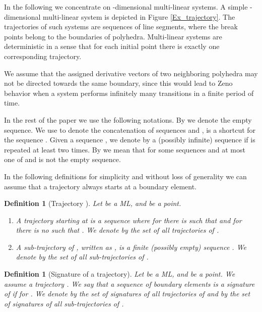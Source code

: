 \documentclass[copyright,creativecommons]{packages/eptcs}
\newcommand{\ml}{\mbox{ML}}
\newtheorem{definition}[theorem]{Definition}
\begin{document}
In the following we concentrate on -dimensional multi-linear  systems. A simple -dimensional multi-linear system  is depicted in Figure \ref{Ex_trajectory}. 
 The trajectories of such systems are sequences of line segments, where the break points belong to the boundaries of  polyhedra. 
Multi-linear systems are deterministic in a sense that for  each initial point there is exactly one corresponding trajectory. 

We assume that the assigned derivative vectors of two neighboring polyhedra may not be directed towards the same boundary,
since this would lead to Zeno behavior when   a system performs infinitely many transitions in a finite period of time.



In the rest of the paper we use the following notations. By  we denote the empty sequence. 
We use  to denote the concatenation of sequences  and ,    is a shortcut for the sequence . Given a sequence , we denote by   a (possibly infinite) sequence  if   is repeated at least two times. By  we mean that  for some sequences  and at most one of  and  is not the empty sequence. 

In the following definitions  for simplicity and without loss of generality we can assume that a trajectory always starts at a boundary element. 

\begin{definition}[Trajectory ] Let   be a \ml, and  be a point.
\begin{enumerate} 
\item A trajectory starting at   is a  sequence  
where for   there is   such that    and for   there is no  such that   . We denote by  the set of all trajectories of . 

\item  A sub-trajectory of , written as ,  is a finite (possibly empty) sequence 
.  We denote by  the set of all sub-trajectories of . 

\end{enumerate}
\end{definition}


\begin{definition}[Signature of a trajectory]
Let   be a \ml, and  be a point. We assume a trajectory   .  We say that a sequence of boundary elements  is  a signature of  if   for .  We denote by  the set of signatures of all trajectories of  and by  the set of signatures of all sub-trajectories of .
 \end{definition}
\end{document}
